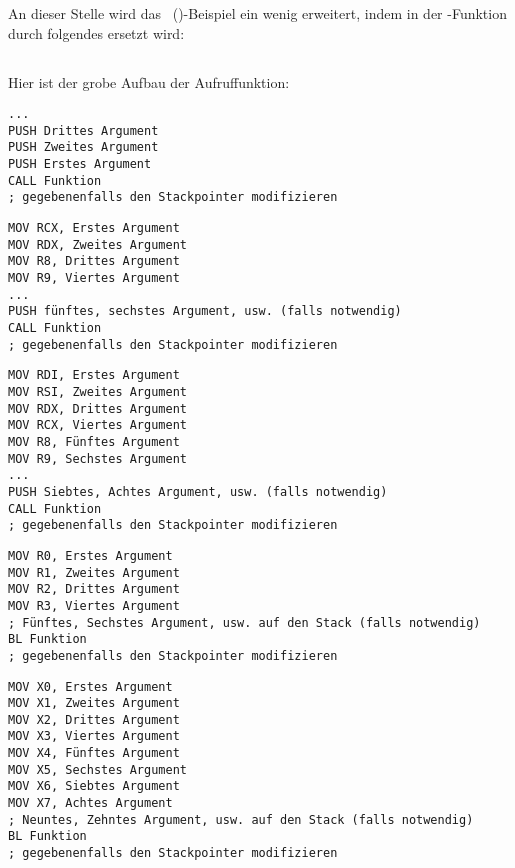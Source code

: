 \mysection{\PrintfSeveralArgumentsSectionName}

An dieser Stelle wird das \IT{\HelloWorldSectionName}~()-Beispiel ein
wenig erweitert, indem \printf in der \main-Funktion durch folgendes ersetzt wird:







\subsection{\Conclusion{}}

Hier ist der grobe Aufbau der Aufruffunktion:

\begin{lstlisting}[caption=x86,style=customasmx86]
...
PUSH Drittes Argument
PUSH Zweites Argument
PUSH Erstes Argument
CALL Funktion
; gegebenenfalls den Stackpointer modifizieren
\end{lstlisting}

\begin{lstlisting}[caption=x64 (MSVC),style=customasmx86]
MOV RCX, Erstes Argument
MOV RDX, Zweites Argument
MOV R8, Drittes Argument
MOV R9, Viertes Argument
...
PUSH fünftes, sechstes Argument, usw. (falls notwendig)
CALL Funktion
; gegebenenfalls den Stackpointer modifizieren
\end{lstlisting}

\begin{lstlisting}[caption=x64 (GCC),style=customasmx86]
MOV RDI, Erstes Argument
MOV RSI, Zweites Argument
MOV RDX, Drittes Argument
MOV RCX, Viertes Argument
MOV R8, Fünftes Argument
MOV R9, Sechstes Argument
...
PUSH Siebtes, Achtes Argument, usw. (falls notwendig)
CALL Funktion
; gegebenenfalls den Stackpointer modifizieren
\end{lstlisting}

\begin{lstlisting}[caption=ARM,style=customasmARM]
MOV R0, Erstes Argument
MOV R1, Zweites Argument
MOV R2, Drittes Argument
MOV R3, Viertes Argument
; Fünftes, Sechstes Argument, usw. auf den Stack (falls notwendig)
BL Funktion
; gegebenenfalls den Stackpointer modifizieren
\end{lstlisting}

\begin{lstlisting}[caption=ARM64,style=customasmARM]
MOV X0, Erstes Argument
MOV X1, Zweites Argument
MOV X2, Drittes Argument
MOV X3, Viertes Argument
MOV X4, Fünftes Argument
MOV X5, Sechstes Argument
MOV X6, Siebtes Argument
MOV X7, Achtes Argument
; Neuntes, Zehntes Argument, usw. auf den Stack (falls notwendig)
BL Funktion
; gegebenenfalls den Stackpointer modifizieren
\end{lstlisting}


